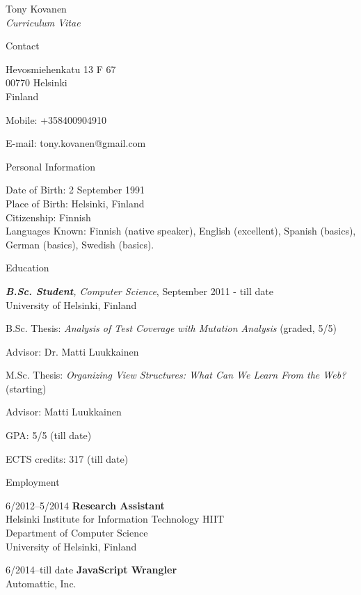 \documentclass[10pt]{article}
\newenvironment{sublist}{%
	\begin{list}{}{%
		\setlength{\itemsep}{0em}\setlength{\parsep}{0em}%
		\setlength{\topsep}{0em}\setlength{\parskip}{0em}%
	}%
}%
{ \end{list} }
\begin{document}
\begin{cv}{Tony Kovanen\\{\large \itshape Curriculum Vitae}}

\begin{cvlist}{Contact}
	\item
	Hevosmiehenkatu 13 F 67\\
	00770 Helsinki\\
	Finland
	\item Mobile: +358400904910
	\item E-mail: tony.kovanen@gmail.com
\end{cvlist}


\begin{cvlist}{Personal Information}
	\item Date of Birth: 2 September 1991\\
		Place of Birth: Helsinki, Finland\\
		Citizenship: Finnish\\
        Languages Known: Finnish (native speaker), English (excellent), Spanish (basics), German (basics), Swedish (basics).
\end{cvlist}

\begin{cvlist}{Education}
	\item \emph{{\bf B.Sc. Student}, Computer Science}, September 2011 - till date\\
	University of Helsinki, Finland
	\begin{sublist}
	\item B.Sc. Thesis: \textit{Analysis of Test Coverage with Mutation Analysis} (graded, 5/5)
	\item Advisor: Dr. Matti Luukkainen
        \item M.Sc. Thesis: \textit{Organizing View Structures: What Can We Learn From the Web?} (starting)
        \item Advisor: Matti Luukkainen
        \item GPA: 5/5 (till date)
        \item ECTS credits: 317 (till date)
	\end{sublist}
\end{cvlist}

\newpage
\begin{cvlist}{Employment}
	\item[6/2012--5/2014] {\bf Research Assistant}\\
	Helsinki Institute for Information Technology HIIT\\
	Department of Computer Science\\
	University of Helsinki, Finland
	\item[6/2014--till date] {\bf JavaScript Wrangler}\\
	Automattic, Inc.
\end{cvlist}


\end{cv}
\end{document}
